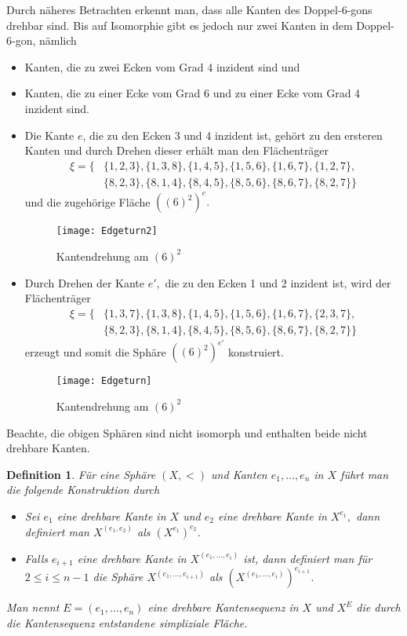 \documentclass[12pt,titlepage,twoside,cleardoublepage]{article}
\theoremstyle{nummermitklammern}
\newtheorem{definition}[temp]{Definition}
\newtheorem{definition}[zahl]{Definition}
\numberwithin{equation}{section}
\begin{document}
Durch näheres Betrachten erkennt man, dass alle Kanten des Doppel-6-gons drehbar sind. Bis auf Isomorphie gibt es jedoch nur zwei Kanten in dem Doppel-6-gon, nämlich 
\begin{itemize}
\item Kanten, die zu zwei Ecken vom Grad 4 inzident sind und
\item Kanten, die zu einer Ecke vom Grad 6 und zu einer Ecke vom Grad 4 inzident sind.
\end{itemize}
\begin{itemize}
\item Die Kante $e$, die zu den Ecken 3 und 4 inzident ist, gehört zu den ersteren Kanten und durch Drehen dieser erhält man den Flächenträger 
\begin{align*}
\xi=\{&\{1,2,3\},\{1,3,8\},\{1,4,5\},\{1,5,6\},\{1,6,7\},\{1,2,7\},\\ 
&\{8,2,3\},\{8,1,4\},\{8,4,5\},\{8,5,6\},\{8,6,7\},\{8,2,7\}\}
\end{align*}
und die zugehörige Fläche ${((6)^2)}^e.$
\begin{figure}[H]
\begin{center}
\texttt{[image: Edgeturn2]}
\end{center}
\caption{Kantendrehung am $(6)^2$ }
\end{figure}
\item Durch Drehen der Kante $e',$ die zu den Ecken 1 und 2 inzident ist, wird der Flächenträger 
\begin{align*}
\xi=\{&\{1,3,7\},\{1,3,8\},\{1,4,5\},\{1,5,6\},\{1,6,7\},\{2,3,7\},\\ 
&\{8,2,3\},\{8,1,4\},\{8,4,5\},\{8,5,6\},\{8,6,7\},\{8,2,7\}\}
\end{align*}
erzeugt und somit die Sphäre ${((6)^2)}^{e'}$ konstruiert.
\begin{figure}[H]
\begin{center}
\texttt{[image: Edgeturn]}
\end{center}
\caption{Kantendrehung am $(6)^2$ }
\end{figure}
\end{itemize}
Beachte, die obigen Sphären sind nicht isomorph und enthalten beide nicht drehbare Kanten.
\begin{definition}
Für eine Sphäre $(X,<)$ und Kanten $e_1,\ldots,e_n$ in $X$ führt man die folgende Konstruktion durch
\begin{itemize}
\item Sei $e_1$ eine drehbare Kante in $X$ und $e_2$ eine drehbare Kante in $X^{e_1},$ dann definiert man $X^{(e_1,e_2)}$ als $(X^{e_1})^{e_2}$.
\item Falls $e_{i+1}$ eine drehbare Kante in $X^{(e_1,\ldots,e_{i})}$ ist, dann definiert man für $2\leq i\leq n-1$ die Sphäre $X^{(e_1,\ldots,e_{i+1})}$ als $(X^{(e_1,\ldots,e_{i})})^{e_{i+1}}$.
\end{itemize}
Man nennt $E=(e_1,\ldots,e_n)$ eine drehbare Kantensequenz in $X$ und $X^E$ die durch die Kantensequenz entstandene simpliziale Fläche. 
\end{definition}
\end{document}
